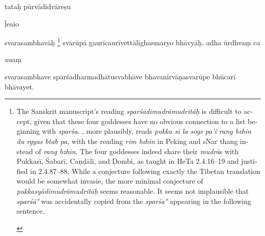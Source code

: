 \documentclass[naipra.tex]{subfiles}
\begin{document}
\begin{sanskrit}

\pstart
tataḥ pūrvādidvāreṣu \begin{mantra}ḹ\dsh e\dsh ai\dsh o\end{mantra}\dsh svarasambhavāḥ \footnote{
	\begin{english}%
		The Sanskrit manuscript's reading \emph{sparśādimudrāmudritāḥ} is difficult to accept, given that these four goddesses have no obvious connection to a list beginning with \emph{sparśa}.
		\TIB , more plausibly, reads \emph{pukka sī la sogs pa'i rang bzhin du rgyas btab pa}, with the reading \emph{rim bzhin} in Peking and sNar thang instead of \emph{rang bzhin}.
		The four goddesses indeed share their \emph{mudrā}s with Pukkasī, Śabarī, Caṇḍālī, and Ḍombi, as taught in HeTa 2.4.16–19 and justified in 2.4.87–88.
		While a conjecture following exactly the Tibetan translation would be somewhat invasie, the more minimal conjecture of \emph{pukkasyādimudrāmudritāḥ} seems reasonable.
		It seems not implausible that \emph{sparśā°} was accidentally copied from the \emph{sparśa°} appearing in the following sentence.
	\end{english}
} svarūpā gaurīcaurīvettālīghasmaryo bhāvyāḥ. 
 adha ūrdhvaṃ ca  \begin{mantra}au\dsh aṃ\end{mantra}\dsh svarasambhave sparśadharmadhātusvabhāve bhavanirvāṇasvarūpe bhūcarī bhāvayet.
\pend



\end{sanskrit}
\end{document}
